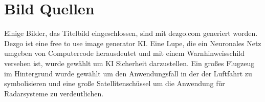 \thispagestyle{empty}
{}\label{cha:Abbildungsverzeichnis}
\listoffigures   
\section{Bild Quellen}
Einige Bilder, das Titelbild eingeschlossen, sind mit dezgo.com generiert worden. 
Dezgo ist eine free to use image generator KI. Eine Lupe, die ein Neuronales Netz umgeben von Computercode herausdeutet
und mit einem Warnhinweisschild versehen ist, wurde gewählt um KI Sicherheit darzustellen.
Ein großes Flugzeug im Hintergrund wurde gewählt um den Anwendungsfall in der der Luftfahrt zu symbolisieren 
und eine große Satellitenschüssel um die Anwendung für Radarsysteme zu verdeutlichen.
\newpage

